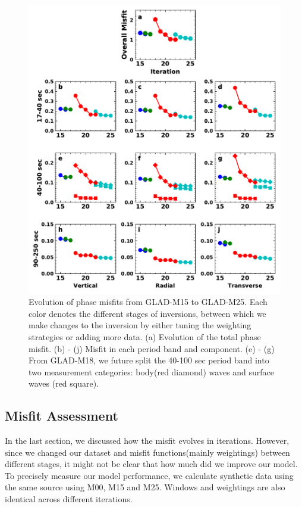 \documentclass[extra,mreferee]{gji}
\begin{document}
\begin{figure}
  \centering
  \includegraphics[width=\textwidth]{figures/misfit.pdf}
  \caption{Evolution of phase misfits from GLAD-M15 to GLAD-M25.
  Each color denotes the different stages of inversions, between
  which we make changes to the inversion by either tuning the
  weighting strategies or adding more data.
  (a) Evolution of the total phase misfit. (b) - (j) Misfit in
  each period band and component. (e) - (g) From GLAD-M18,
  we future split the 40-100 sec period band into two
  measurement categories: body(red diamond) waves and surface waves
  (red square).}
  \label{fig:misfit}
\end{figure}

\subsection{Misfit Assessment}

In the last section, we discussed how the misfit evolves in iterations. However, since
we changed our dataset and misfit functions(mainly weightings) between different stages,
it might not be clear that how much did we improve our model. To precisely measure
our model performance, we calculate synthetic data using the same source using M00, M15
and M25. Windows and weightings are also identical across different iterations.
\end{document}
